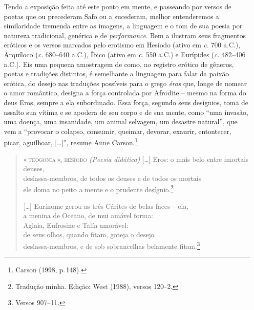 Tendo a exposição feita até este ponto em mente, e passeando por versos de poetas que ou precederam Safo ou
a sucederam, melhor entenderemos a similaridade tremenda entre as imagens, a
linguagem e o tom de sua poesia por natureza tradicional, genérica e de \textit{performance}. Bem a ilustram seus fragmentos eróticos e os versos marcados pelo
erotismo em Hesíodo (ativo em \textit{c.} 700 a.C.), Arquíloco (\textit{c.} 680--640
a.C.), Íbico (ativo em \textit{c.} 550 a.C.) e Eurípides (\textit{c.} 482--406 a.C.). Eis
uma pequena amostragem de como, no registro erótico de gêneros, poetas e
tradições distintos, é semelhante a linguagem para falar da paixão erótica, do
desejo nas traduções possíveis para o grego \textit{éros} que, longe de nomear
o amor romântico, designa a força controlada por Afrodite -- mesmo na forma do
deus Eros, sempre a ela subordinado. Essa força, segundo seus desígnios, toma de
assalto sua vítima e se apodera de seu corpo e de sua mente, como “uma invasão,
uma doença, uma insanidade, um animal selvagem, um desastre natural”, que vem a
“provocar o colapso, consumir, queimar, devorar, exaurir, entontecer, picar,
aguilhoar, {[}\ldots{}{]}”, resume Anne Carson.\footnote{ Carson (1998, p.\,148).}


\begin{verse}
\small{\textsc{«\,teogonia\,», hesíodo}
\textit{(Poesia didática)}
\smallskip
{[}\ldots{}{]} Eros: o mais belo entre imortais deuses,\\
deslassa-membros, de todos os deuses e de todos os mortais\\
ele doma no peito a mente e o prudente desígnio.\footnote{Tradução minha. Edição: West (1988), versos 120--2.}
\smallskip
\hspace*{35mm}
\smallskip

{[}\ldots{}{]} Eurínome gerou as três Cárites de belas faces -- ela,\\
\hspace*{2em}a menina de Oceano, de mui amável forma:\\
\hspace*{2em}Aglaia, Eufrosine e Talía amorável:\\
\hspace*{2em}de seus olhos, quando fitam, goteja o desejo\\
\hspace*{2em}deslassa-membros, e de sob sobrancelhas belamente fitam.\footnote{Versos 907--11.}}
\end{verse}

